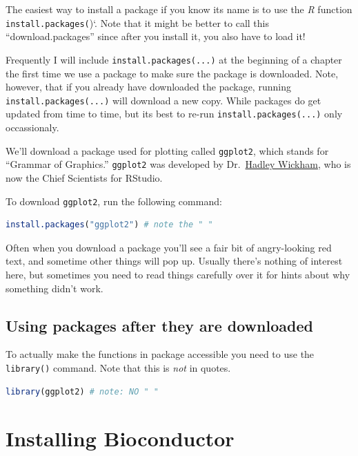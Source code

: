 \documentclass[
]{book}
\newcommand{\passthrough}[1]{#1}
\begin{document}
The easiest way to install a package if you know its name is to use the \emph{R} function \passthrough{\lstinline!install.packages(!})`. Note that it might be better to call this ``download.packages'' since after you install it, you also have to load it!

Frequently I will include \passthrough{\lstinline!install.packages(...)!} at the beginning of a chapter the first time we use a package to make sure the package is downloaded. Note, however, that if you already have downloaded the package, running \passthrough{\lstinline!install.packages(...)!} will download a new copy. While packages do get updated from time to time, but its best to re-run \passthrough{\lstinline!install.packages(...)!} only occassionaly.

We'll download a package used for plotting called \passthrough{\lstinline!ggplot2!}, which stands for ``Grammar of Graphics.'' \passthrough{\lstinline!ggplot2!} was developed by Dr.~\href{http://hadley.nz/}{Hadley Wickham}, who is now the Chief Scientists for RStudio.

To download \passthrough{\lstinline!ggplot2!}, run the following command:

\begin{lstlisting}[language=R]
install.packages("ggplot2") # note the " "
\end{lstlisting}

Often when you download a package you'll see a fair bit of angry-looking red text, and sometime other things will pop up. Usually there's nothing of interest here, but sometimes you need to read things carefully over it for hints about why something didn't work.

\hypertarget{using-packages-after-they-are-downloaded}{%
\section{Using packages after they are downloaded}\label{using-packages-after-they-are-downloaded}}

To actually make the functions in package accessible you need to use the \passthrough{\lstinline!library()!} command. Note that this is \emph{not} in quotes.

\begin{lstlisting}[language=R]
library(ggplot2) # note: NO " "
\end{lstlisting}

\hypertarget{installing-bioconductor}{%
\chapter{Installing Bioconductor}\label{installing-bioconductor}}
\end{document}
